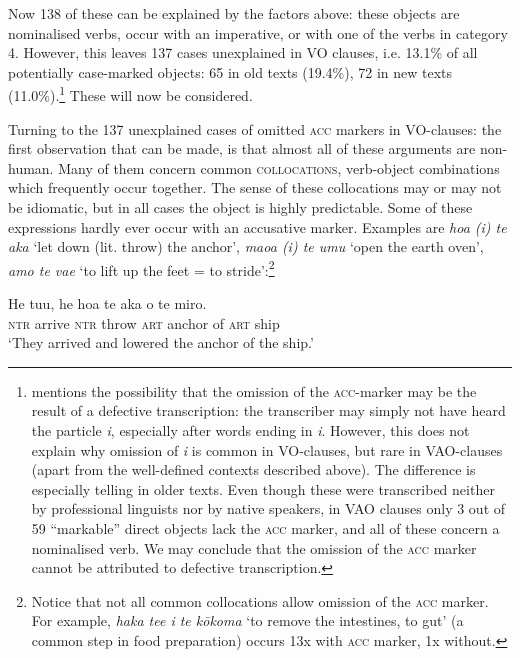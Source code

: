 Now 138 of these can be explained by the factors above: these objects are nominalised verbs, occur with an imperative, or with one of the verbs in category 4. However, this leaves 137 cases unexplained in VO clauses, i.e. 13.1\% of all potentially case-marked objects: 65 in old texts (19.4\%), 72 in new texts (11.0\%).\footnote{\label{fn:408}\citet[50–51]{WeberN2003} mentions the possibility that the omission of the \textsc{acc}{}-marker may be the result of a defective transcription: the transcriber may simply not have heard the particle \textit{i}, especially after words ending in \textit{i}. However, this does not explain why omission of \textit{i} is common in VO-clauses, but rare in VAO-clauses (apart from the well-defined contexts described above). The difference is especially telling in older texts. Even though these were transcribed neither by professional linguists nor by native speakers, in VAO clauses only 3 out of 59 “markable” direct objects lack the \textsc{acc} marker, and all of these concern a nominalised verb. We may conclude that the omission of the \textsc{acc} marker cannot be attributed to defective transcription.} These will now be considered.

Turning to the 137 unexplained cases of omitted \textsc{acc} markers in VO-clauses: the first observation that can be made, is that almost all of these arguments are non-human. Many of them concern common \textsc{collocations}, verb-object combinations which frequently occur together. The sense of these collocations may or may not be idiomatic, but in all cases the object is highly predictable. Some of these expressions hardly ever occur with an accusative marker. Examples are \textit{hoa (i) te {\ꞌ}aka} ‘let down (lit. throw) the anchor’, \textit{\mbox{ma{\ꞌ}oa} (i) te {\ꞌ}umu} ‘open the earth oven’, \textit{{\ꞌ}amo te va{\ꞌ}e} ‘to lift up the feet = to stride’:\footnote{\label{fn:409}Notice that not all common collocations allow omission of the \textsc{acc} marker. For example, \textit{haka te{\ꞌ}e i te kōkoma} ‘to remove the intestines, to gut’ (a common step in food preparation) occurs 13x with \textsc{acc} marker, 1x without.}

\ea\label{ex:8.40}
\gll He tu{\ꞌ}u, he hoa te {\ꞌ}aka o te miro.\\
\textsc{ntr} arrive \textsc{ntr} throw \textsc{art} anchor of \textsc{art} ship\\

\glt
‘They arrived and lowered the anchor of the ship.’ \textstyleExampleref{[Egt-02.099]}
\z

